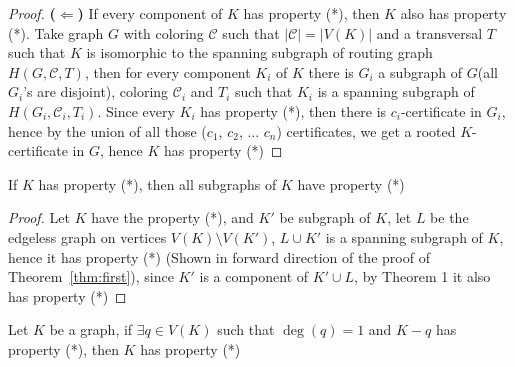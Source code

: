 \begin{proof}
    \textbf{(\(\Leftarrow\))} If every component of \(K\) has property (*), then $K$ also has property (*). 
        \newline
        Take graph $G$ with coloring $\mathcal{C}$ such that $|\mathcal{C}| = |V(K)|$
        and a transversal $T$ such that $K$ is isomorphic to the spanning subgraph of routing graph $H(G, \mathcal{C}, T)$, 
        then for every component $K_{i}$ of $K$ there is $G_{i}$ a subgraph of $G$(all $G_{i}$'s are disjoint), coloring $\mathcal{C}_{i}$ and $T_{i}$ such that $K_{i}$ is a spanning subgraph of $H(G_{i}, \mathcal{C}_{i}, T_{i})$.
        Since every $K_{i}$ has property (*), then there is $c_{i}$-certificate in $G_{i}$, hence by the union of all those ($c_{1}$, $c_{2}$, ... $c_{n}$) certificates, we get a rooted $K$-certificate in $G$, hence $K$ has property (*)
\end{proof}

\begin{thm}
    If $K$ has property (*), then all subgraphs of $K$ have property (*)
\end{thm}

\begin{proof}
    Let $K$ have the property (*), and $K'$ be subgraph of $K$, let $L$ be the edgeless graph on vertices $V(K) \setminus V(K')$,
    $L \cup K'$ is a spanning subgraph of $K$, hence it has property (*) (Shown in forward direction of the proof of Theorem~\ref{thm:first}), since $K'$ is a component of $K' \cup L$, by Theorem 1 it also has property (*)
\end{proof}

\begin{lemma}
    Let $K$ be a graph, if $\exists q \in V(K)$ such that $\deg(q) = 1$ and $K - q$ has property (*), then $K$ has property (*)
\end{lemma}

